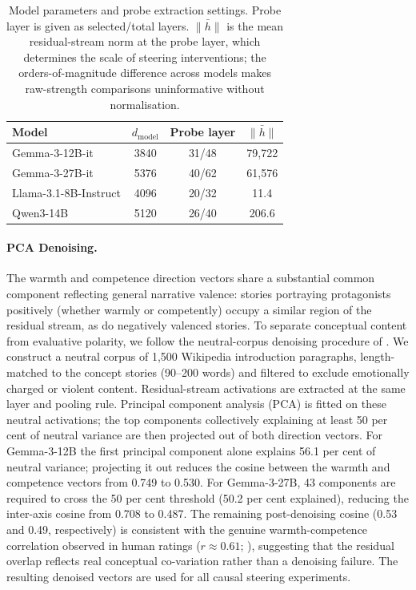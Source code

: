\documentclass[twocolumn]{article}
\begin{document}
\begin{table}[t]
\centering
\small
\caption{%
  Model parameters and probe extraction settings.
  Probe layer is given as selected/total layers.
  $\bar{\|h\|}$ is the mean residual-stream norm at the probe layer,
  which determines the scale of steering interventions;
  the orders-of-magnitude difference across models makes raw-strength
  comparisons uninformative without normalisation.
}
\label{tab:models}
\begin{tabular}{lccc}
\toprule
Model & $d_\mathrm{model}$ & Probe layer & $\bar{\|h\|}$ \\
\midrule
Gemma-3-12B-it          & 3840 & 31/48 & 79{,}722 \\
Gemma-3-27B-it          & 5376 & 40/62 & 61{,}576 \\
Llama-3.1-8B-Instruct   & 4096 & 20/32 & 11.4     \\
Qwen3-14B               & 5120 & 26/40 & 206.6    \\
\bottomrule
\end{tabular}
\end{table}

\paragraph{PCA Denoising.}
The warmth and competence direction vectors share a substantial common
component reflecting general narrative valence: stories portraying protagonists
positively (whether warmly or competently) occupy a similar region of the
residual stream, as do negatively valenced stories.
To separate conceptual content from evaluative polarity, we follow the
neutral-corpus denoising procedure of \citet{sofroniew2026emotion}.
We construct a neutral corpus of 1,500 Wikipedia introduction paragraphs,
length-matched to the concept stories (90--200 words) and filtered to exclude
emotionally charged or violent content.
Residual-stream activations are extracted at the same layer and pooling rule.
Principal component analysis (PCA) is fitted on these neutral activations;
the top components collectively explaining at least 50 per cent of neutral variance
are then projected out of both direction vectors.
For Gemma-3-12B the first principal component alone explains 56.1 per cent of
neutral variance; projecting it out reduces the cosine between the warmth and
competence vectors from 0.749 to 0.530.
For Gemma-3-27B, 43 components are required to cross the 50 per cent threshold
(50.2 per cent explained), reducing the inter-axis cosine from 0.708 to 0.487.
The remaining post-denoising cosine (0.53 and 0.49, respectively) is consistent
with the genuine warmth-competence correlation observed in human ratings
($r \approx 0.61$; \citealt{fiske2002model}), suggesting that the residual
overlap reflects real conceptual co-variation rather than a denoising failure.
The resulting denoised vectors are used for all causal steering experiments.
\end{document}
